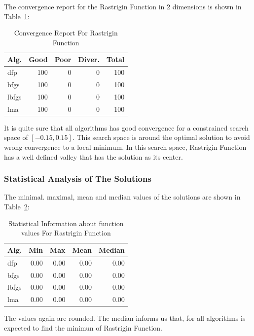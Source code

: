 \documentclass[conference]{IEEEtran}
\begin{document}
The convergence report for the Rastrigin Function in 2 dimensions is shown in Table~\ref{convergence:rastrigin30d}:

\begin{table}[H]
\centering
\caption{Convergence Report For Rastrigin Function}
\label{convergence:rastrigin30d}
\begin{tabular}{lrrrr}
\toprule
 Alg. &  Good &  Poor &  Diver. &  Total \\
\midrule
  dfp &   100 &     0 &       0 &    100 \\
 bfgs &   100 &     0 &       0 &    100 \\
lbfgs &   100 &     0 &       0 &    100 \\
  lma &   100 &     0 &       0 &    100 \\
\bottomrule
\end{tabular}
\end{table}


It is quite sure that all algorithms has good convergence for a
constrained search space of $\left[-0.15, 0.15\right]$. This search space is around
the optimal solution to avoid wrong convergence to a local minimum. In this search space,
Rastrigin Function has a well defined valley that has the solution as its center.
\subsubsection{Statistical Analysis of The Solutions}
\label{statisticalanalysisrastrigin30d30D}


The minimal. maximal, mean and median values of the solutions are shown in Table~\ref{function_values:rastrigin30d}:

\begin{table}[H]
\centering
\caption{Statistical Information about function values For Rastrigin Function}
\label{function_values:rastrigin30d}
\begin{tabular}{lrrrr}
\toprule
 Alg. &  Min &  Max &  Mean &  Median \\
\midrule
  dfp & 0.00 & 0.00 &  0.00 &    0.00 \\
 bfgs & 0.00 & 0.00 &  0.00 &    0.00 \\
lbfgs & 0.00 & 0.00 &  0.00 &    0.00 \\
  lma & 0.00 & 0.00 &  0.00 &    0.00 \\
\bottomrule
\end{tabular}
\end{table}

The values again are rounded. The median informs us that, for all
algorithms is expected to find the minimun of Rastrigin Function.
\end{document}
